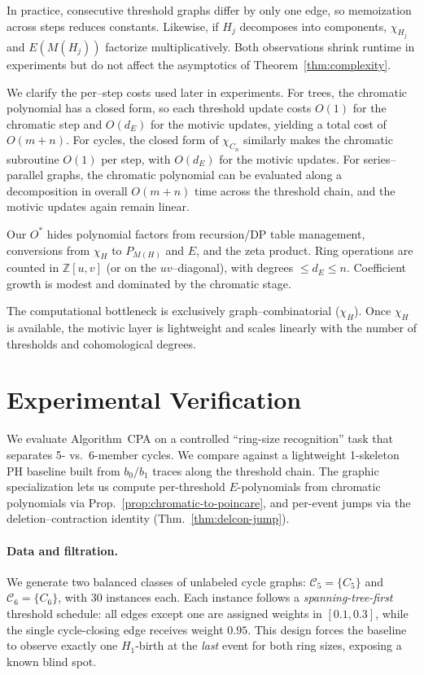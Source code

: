 \documentclass[runningheads]{llncs}
\begin{document}
In practice, consecutive threshold graphs differ by only one edge, so 
memoization across steps reduces constants. Likewise, if $H_j$ decomposes into
components, $\chi_{H_j}$ and $E(M(H_j))$ factorize multiplicatively. 
Both observations shrink runtime in experiments but do not affect 
the asymptotics of Theorem~\ref{thm:complexity}.

We clarify the per–step costs used later in experiments. 
For trees, the chromatic polynomial has a closed form, so each threshold update costs $O(1)$ for the
chromatic step and $O(d_E)$ for the motivic updates, yielding a total cost of $O(m+n)$. 
For cycles, the closed form of $\chi_{C_n}$ similarly makes the chromatic subroutine $O(1)$ per step, with
$O(d_E)$ for the motivic updates. 
For series–parallel graphs, the chromatic polynomial can be evaluated along a decomposition in overall
$O(m+n)$ time across the threshold chain, and the motivic updates again remain linear.

Our $O^\ast$ hides polynomial factors from recursion/DP table management, 
conversions from $\chi_H$ to $P_{M(H)}$ and $E$, and the zeta product. 
Ring operations are counted in $\mathbb{Z}[u,v]$ (or on the $uv$–diagonal), 
with degrees $\le d_E\le n$. Coefficient growth is modest and dominated by 
the chromatic stage.

The computational bottleneck is exclusively graph–combinatorial ($\chi_H$).
Once $\chi_H$ is available, the motivic layer is lightweight and scales linearly
with the number of thresholds and cohomological degrees.












\section{Experimental Verification}
\label{sec:expts}

We evaluate Algorithm~CPA on a controlled ``ring-size recognition'' task that
separates 5- vs.\ 6-member cycles. We compare against a lightweight 1-skeleton PH baseline built from
$b_0/b_1$ traces along the threshold chain. The graphic specialization lets us
compute per-threshold $E$-polynomials from chromatic polynomials via
Prop.~\ref{prop:chromatic-to-poincare}, and per-event jumps via the
deletion–contraction identity (Thm.~\ref{thm:delcon-jump}).

\paragraph{Data and filtration.}
We generate two balanced classes of unlabeled cycle graphs:
\(\mathcal{C}_5=\{C_5\}\) and \(\mathcal{C}_6=\{C_6\}\), with 30 instances each.
Each instance follows a \emph{spanning-tree-first} threshold schedule: all edges
except one are assigned weights in \([0.1,0.3]\), while the single cycle-closing
edge receives weight \(0.95\).
This design forces the baseline to observe exactly one $H_1$-birth at the
\emph{last} event for both ring sizes, exposing a known blind spot.
\end{document}
